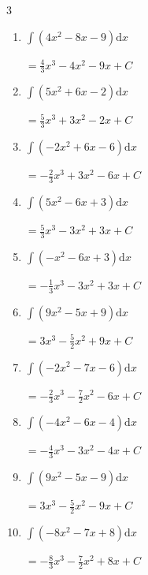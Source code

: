 \begin{multicols}{3}
\begin{enumerate}
        $\displaystyle =-x^{3}-2x^{2}+8x+ C$

  \item $\displaystyle \int \left( 4x^{2}-8x-9 \right) \mathrm{d}x$

        $\displaystyle =\frac{4}{3}x^{3}-4x^{2}-9x+ C$

  \item $\displaystyle \int \left( 5x^{2}+6x-2 \right) \mathrm{d}x$

        $\displaystyle =\frac{5}{3}x^{3}+3x^{2}-2x+ C$

  \item $\displaystyle \int \left( -2x^{2}+6x-6 \right) \mathrm{d}x$

        $\displaystyle =-\frac{2}{3}x^{3}+3x^{2}-6x+ C$

  \item $\displaystyle \int \left( 5x^{2}-6x+3 \right) \mathrm{d}x$

        $\displaystyle =\frac{5}{3}x^{3}-3x^{2}+3x+ C$

  \item $\displaystyle \int \left( -x^{2}-6x+3 \right) \mathrm{d}x$

        $\displaystyle =-\frac{1}{3}x^{3}-3x^{2}+3x+ C$

  \item $\displaystyle \int \left( 9x^{2}-5x+9 \right) \mathrm{d}x$

        $\displaystyle =3x^{3}-\frac{5}{2}x^{2}+9x+ C$

  \item $\displaystyle \int \left( -2x^{2}-7x-6 \right) \mathrm{d}x$

        $\displaystyle =-\frac{2}{3}x^{3}-\frac{7}{2}x^{2}-6x+ C$

  \item $\displaystyle \int \left( -4x^{2}-6x-4 \right) \mathrm{d}x$

        $\displaystyle =-\frac{4}{3}x^{3}-3x^{2}-4x+ C$

  \item $\displaystyle \int \left( 9x^{2}-5x-9 \right) \mathrm{d}x$

        $\displaystyle =3x^{3}-\frac{5}{2}x^{2}-9x+ C$

\columnbreak %

  \item $\displaystyle \int \left( -8x^{2}-7x+8 \right) \mathrm{d}x$

        $\displaystyle =-\frac{8}{3}x^{3}-\frac{7}{2}x^{2}+8x+ C$


\end{enumerate}
\end{multicols}
